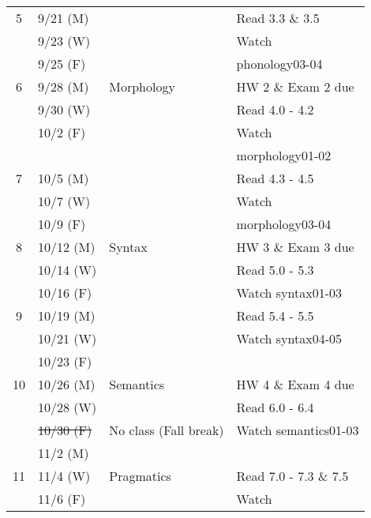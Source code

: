 \documentclass{article}
\begin{document}
\begin{longtable}{c l l | l}
      \hline
      5     & 9/21 (M)    &                                 & Read 3.3 \& 3.5\\
            & 9/23 (W)    &                                 & Watch\\
            & 9/25 (F)    &                                 & phonology03-04\\
      \hline
      6     & 9/28 (M)    & Morphology                      & HW 2 \& Exam 2 due\\
            & 9/30 (W)    &                                 & Read 4.0 - 4.2\\
            & 10/2 (F)    &                                 & Watch\\
            &             &                                 & morphology01-02\\
      \hline
      7     & 10/5 (M)    &                                 & Read 4.3 - 4.5\\
            & 10/7 (W)    &                                 & Watch\\
            & 10/9 (F)    &                                 & morphology03-04\\
      \hline
      8     & 10/12 (M)   & Syntax                          & HW 3 \& Exam 3 due\\
            & 10/14 (W)   &                                 & Read 5.0 - 5.3\\
            & 10/16 (F)   &                                 & Watch syntax01-03\\
      \hline
      9     & 10/19 (M)   &                                 & Read 5.4 - 5.5\\
            & 10/21 (W)   &                                 & Watch syntax04-05\\
            & 10/23 (F)   &                                 & \\
      \hline
      10    & 10/26 (M)   & Semantics                       & HW 4 \& Exam 4 due\\
            & 10/28 (W)   &                                 & Read 6.0 - 6.4\\
            & \sout{10/30 (F)}   & No class (Fall break)    & Watch semantics01-03\\
            & 11/2 (M)    &                                 & \\
      \hline
      11    & 11/4 (W)    & Pragmatics                      & Read 7.0 - 7.3 \& 7.5\\
            & 11/6 (F)    &                                 & Watch\\

\end{longtable}
\end{document}
